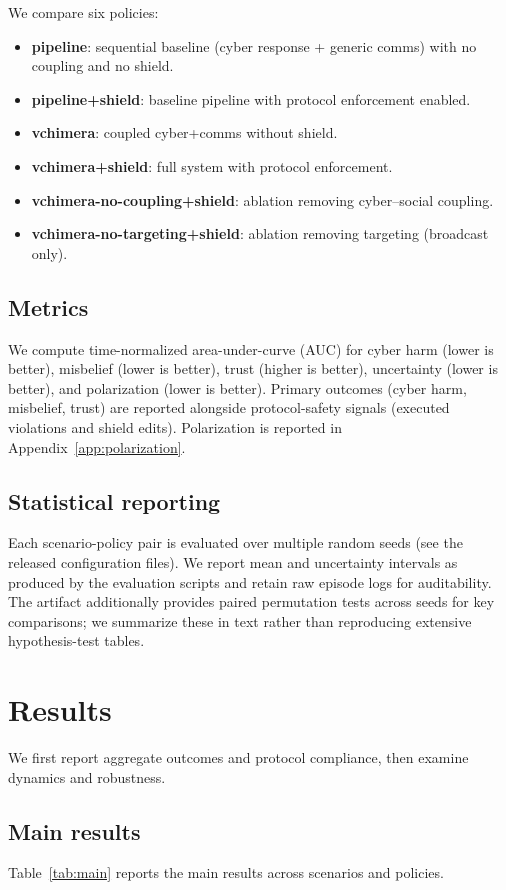 \documentclass[referee,lineno,sn-basic]{sn-jnl}
\begin{document}
We compare six policies:
\begin{itemize}[leftmargin=*]
  \item \textbf{pipeline}: sequential baseline (cyber response + generic comms) with no coupling and no shield.
  \item \textbf{pipeline+shield}: baseline pipeline with protocol enforcement enabled.
  \item \textbf{vchimera}: coupled cyber+comms without shield.
  \item \textbf{vchimera+shield}: full system with protocol enforcement.
  \item \textbf{vchimera-no-coupling+shield}: ablation removing cyber--social coupling.
  \item \textbf{vchimera-no-targeting+shield}: ablation removing targeting (broadcast only).
\end{itemize}

\subsection{Metrics}
We compute time-normalized area-under-curve (AUC) for cyber harm (lower is better), misbelief (lower is better), trust (higher is better), uncertainty (lower is better), and polarization (lower is better). Primary outcomes (cyber harm, misbelief, trust) are reported alongside protocol-safety signals (executed violations and shield edits). Polarization is reported in Appendix~\ref{app:polarization}.

\subsection{Statistical reporting}
Each scenario-policy pair is evaluated over multiple random seeds (see the released configuration files). We report mean and uncertainty intervals as produced by the evaluation scripts and retain raw episode logs for auditability. The artifact additionally provides paired permutation tests across seeds for key comparisons; we summarize these in text rather than reproducing extensive hypothesis-test tables.

\section{Results}
We first report aggregate outcomes and protocol compliance, then examine dynamics and robustness.

\subsection{Main results}
Table~\ref{tab:main} reports the main results across scenarios and policies.
\end{document}
